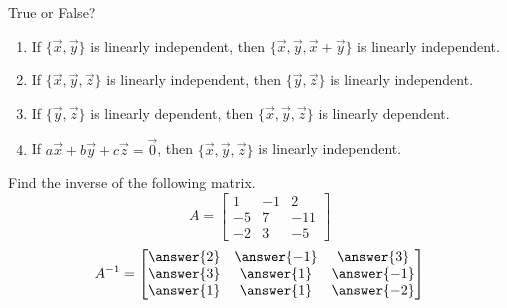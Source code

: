 \documentclass{ximera}
\begin{document}
\begin{exercise}
True or False?
 
\begin{enumerate}
    \item If $\{\vec{x}, \vec{y}\}$ is linearly independent, then $\{\vec{x}, \vec{y}, \vec{x}+\vec{y}\}$ is linearly independent.
    \begin{multipleChoice}
 \end{multipleChoice}
  
 \item If $\{\vec{x}, \vec{y}, \vec{z}\}$ is linearly independent, then $\{\vec{y}, \vec{z}\}$ is linearly independent.
 \begin{multipleChoice}
 \end{multipleChoice}
  
 \item If $\{\vec{y}, \vec{z}\}$ is linearly dependent, then $\{\vec{x}, \vec{y}, \vec{z}\}$ is linearly dependent.
 \begin{multipleChoice}
 \end{multipleChoice}
  
 \item If $a\vec{x}+b\vec{y}+c\vec{z}=\vec{0}$, then $\{\vec{x}, \vec{y}, \vec{z}\}$ is linearly independent.
 \begin{multipleChoice}
 \end{multipleChoice}
  
\end{enumerate}
\end{exercise}

\begin{exercise}
Find the inverse of the following matrix.
$$A=\begin{bmatrix}1 & -1 & 2\\-5 & 7 & -11\\-2 & 3 &-5\end{bmatrix}$$
$$A^{-1}=\begin{bmatrix}\answer{2} & \answer{-1} & \answer{3}\\\answer{3} & \answer{1} & \answer{-1}\\\answer{1} & \answer{1} &\answer{-2}\end{bmatrix}$$
  
\end{exercise}
\end{document}
